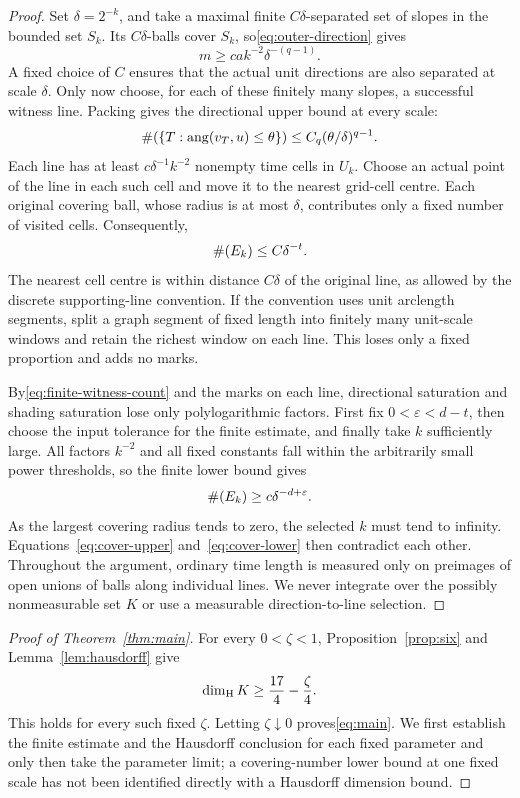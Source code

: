 \begin{proof}
Set $\delta=2^{-k}$, and take a maximal finite $C\delta$-separated set of slopes in the bounded set $S_k$.
Its $C\delta$-balls cover $S_k$, so\eqref{eq:outer-direction} gives
\begin{equation}\label{eq:finite-witness-count}
 m\ge c a k^{-2}\delta^{-(q-1)}.
\end{equation}
A fixed choice of $C$ ensures that the actual unit directions are also separated at scale $\delta$.
Only now choose, for each of these finitely many slopes, a successful witness line.
Packing gives the directional upper bound at every scale:
\[
 \#\!\left(\{T:\operatorname{ang}(v_T,u)\le\theta\}\right)
 \le C_q(\theta/\delta)^{q-1}.
\]
Each line has at least $c\delta^{-1}k^{-2}$ nonempty time cells in $U_k$.
Choose an actual point of the line in each such cell and move it to the nearest grid-cell centre.
Each original covering ball, whose radius is at most $\delta$, contributes only a fixed number of visited cells. Consequently,
\begin{equation}\label{eq:cover-upper}
 \#\!\left(E_k\right)\le C\delta^{-t}.
\end{equation}
The nearest cell centre is within distance $C\delta$ of the original line,
as allowed by the discrete supporting-line convention.
If the convention uses unit arclength segments, split a graph segment of fixed length into finitely many unit-scale windows
and retain the richest window on each line. This loses only a fixed proportion and adds no marks.

By\eqref{eq:finite-witness-count} and the marks on each line,
directional saturation and shading saturation lose only polylogarithmic factors.
First fix $0<\varepsilon<d-t$, then choose the input tolerance for the finite estimate, and finally take $k$ sufficiently large.
All factors $k^{-2}$ and all fixed constants fall within the arbitrarily small power thresholds, so the finite lower bound gives
\begin{equation}\label{eq:cover-lower}
 \#\!\left(E_k\right)\ge c\delta^{-d+\varepsilon}.
\end{equation}
As the largest covering radius tends to zero, the selected $k$ must tend to infinity.
Equations~\eqref{eq:cover-upper} and~\eqref{eq:cover-lower} then contradict each other.
Throughout the argument, ordinary time length is measured only on preimages of open unions of balls along individual lines.
We never integrate over the possibly nonmeasurable set $K$ or use a measurable direction-to-line selection.
\end{proof}

\begin{proof}[Proof of Theorem~\ref{thm:main}]
For every $0<\zeta<1$, Proposition~\ref{prop:six} and Lemma~\ref{lem:hausdorff} give
\[
 \operatorname{dim}_{\mathrm H} K\ge\frac{17}{4}-\frac\zeta4.
\]
This holds for every such fixed $\zeta$. Letting $\zeta\downarrow0$ proves\eqref{eq:main}.
We first establish the finite estimate and the Hausdorff conclusion for each fixed parameter and only then take the parameter limit;
a covering-number lower bound at one fixed scale has not been identified directly with a Hausdorff dimension bound.
\end{proof}

